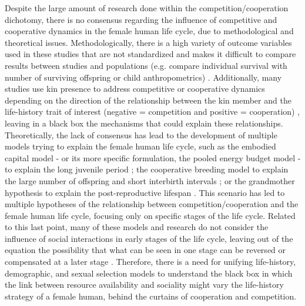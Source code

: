\documentclass{article}
\begin{document}
Despite the large amount of research done within the competition/cooperation dichotomy, there is no consensus regarding the influence of competitive and cooperative dynamics in the female human life cycle, due to methodological and theoretical issues. Methodologically, there is a high variety of outcome variables used in these studies that are not standardized and makes it difficult to compare results between studies and populations (e.g. compare   individual survival with number of surviving offspring or child anthropometrics) \citep{brown2002reconsidering}. Additionally, many studies use kin presence to address competitive or cooperative dynamics depending on the direction of the relationship between the kin member and the life-history trait of interest (negative = competition and positive = cooperation) \citep{sear2011much}, leaving in a black box the mechanisms that could explain these relationships. Theoretically, the lack of consensus has lead to the development of multiple models trying to explain the female human life cycle, such as the embodied capital model - or its more specific formulation, the pooled energy budget model - to explain the long juvenile period \citep{kaplan2000theory,kramer2010pooled}; the cooperative breeding model to explain the large number of offspring and short interbirth intervals \citep{kramer2005children}; or the grandmother hypothesis to explain the post-reproductive lifespan \citep{hawkes2013grandmothers}. This scenario has led to multiple hypotheses of the relationship between competition/cooperation and the female human life cycle, focusing only on specific stages of the life cycle. Related to this last point, many of these models and research do not consider the influence of social interactions in early stages of the life cycle, leaving out of the equation the possibility that what can be seen in one stage can be reversed or compensated at a later stage \citep{mulder1998demographic}. Therefore, there is a need for unifying life-history, demographic, and sexual selection models to understand the black box in which the link between resource availability and sociality might vary the life-history strategy of a female human, behind the curtains of cooperation and competition.
\\\\
\end{document}
